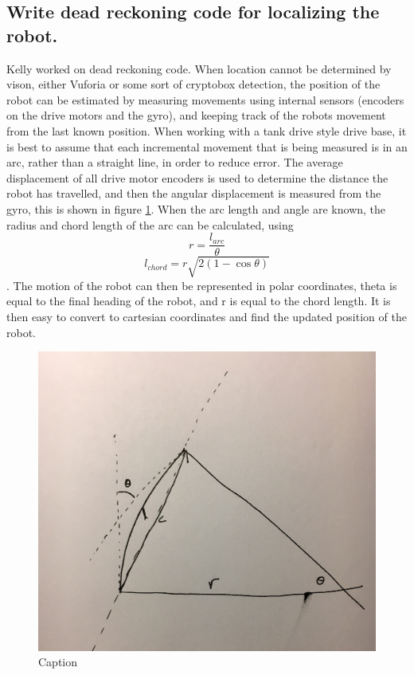 \documentclass{article}
\begin{document}
\subsection{Write dead reckoning code for localizing the robot.}
Kelly worked on dead reckoning code. When location cannot be determined by vison, either Vuforia or some sort of cryptobox detection, the position of the robot can be estimated by measuring movements using internal sensors (encoders on the drive motors and the gyro), and keeping track of the robots movement from the last known position. When working with a tank drive style drive base, it is best to assume that each incremental movement that is being measured is in an arc, rather than a straight line, in order to reduce error. The average displacement of all drive motor encoders is used to determine the distance the robot has travelled, and then the angular displacement is measured from the gyro, this is shown in figure \ref{fig:twist}. When the arc length and angle are known, the radius and chord length of the arc can be calculated, using $$r=\frac{l_{arc}}{\theta}$$ $$l_{chord} = r \sqrt{2(1-\cos{\theta})}$$. The motion of the robot can then be represented in polar coordinates, theta is equal to the final heading of the robot, and r is equal to the chord length. It is then easy to convert to cartesian coordinates and find the updated position of the robot.
\begin{figure}[h]
    \centering
    \includegraphics[width=.6\textwidth]{02/images/twist.jpg}
    \caption{Caption}
    \label{fig:twist}
\end{figure}
\end{document}

